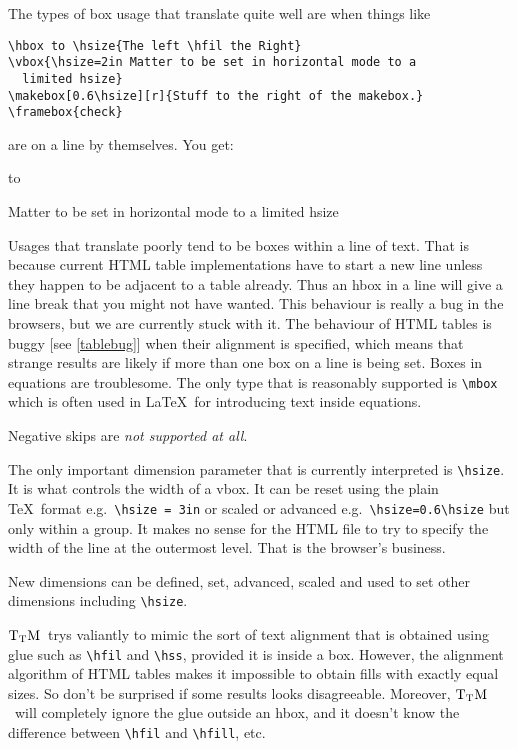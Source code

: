 \documentclass[12pt]{article}
\def\TtM{$\rm{}T_TH$}
\def\TtM{$\rm{}T_TM$}%
\begin{document}
The types of box usage that translate quite well are when things like
\begin{verbatim}
\hbox to \hsize{The left \hfil the Right}
\vbox{\hsize=2in Matter to be set in horizontal mode to a 
  limited hsize}
\makebox[0.6\hsize][r]{Stuff to the right of the makebox.}
\framebox{check}
\end{verbatim}
are on a line by themselves.
You get:

\hbox to 

\vbox{\hsize=2in Matter to be set in horizontal mode to a limited hsize}



Usages that translate poorly tend to be boxes within a line of
text. That is because current HTML table implementations have to start
a new line unless they happen to be adjacent to a table already. Thus
an hbox in a line will give a line break that you might not have
wanted. This behaviour is really a bug in the browsers, but we are
currently stuck with it. The behaviour of HTML tables is buggy
[see \ref{tablebug}] when their alignment is specified, which means that
strange results are likely if more than one box on a line is being
set. Boxes in equations are troublesome. The only type that is
reasonably supported is \verb!\mbox! which is often used in \LaTeX\ for
introducing text inside equations.

Negative skips are \emph{not supported at all}.

The only important dimension parameter that is currently interpreted
is \verb!\hsize!. It is what controls the width of a vbox.  It can be
reset using the plain \TeX\ format e.g.~\verb!\hsize = 3in! or scaled
or advanced e.g.~\verb!\hsize=0.6\hsize!  but only within a group. It
makes no sense for the HTML file to try to specify the width of the
line at the outermost level. That is the browser's business.

New dimensions can be defined, set, advanced, scaled and used to set
other dimensions including \verb!\hsize!. 

\TtM\ trys valiantly to mimic the sort of text alignment that is
obtained using glue such as \verb!\hfil! and \verb!\hss!, provided it
is inside a box. However, the alignment algorithm of HTML tables makes
it impossible to obtain fills with exactly equal sizes. So don't be
surprised if some results looks disagreeable. Moreover, \TtM\ will
completely ignore the glue outside an hbox, and it doesn't know
the difference between \verb!\hfil! and \verb!\hfill!, etc.
\end{document}
